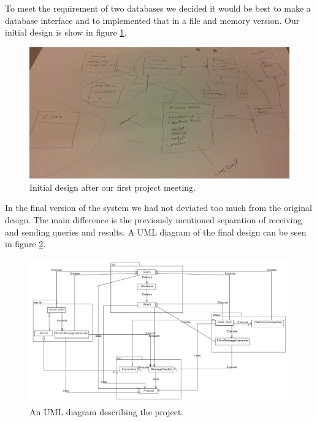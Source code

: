 \documentclass[10pt, a4paper]{article}
\begin{document}
To meet the requirement of two databases we decided it would be best to make a database interface and to implemented that in a file and memory version. Our initial design is show in figure \ref{init+design}.

\begin{figure}[hbt]
\begin{center}
\includegraphics[scale=0.38]{img/uml_blueprint.png}
\end{center}
\label{init+design}
\caption{Initial design after our first project meeting.}
\end{figure}

In the final version of the system we had not deviated too much from the original design. The main difference is the previously mentioned separation of receiving and sending queries and results. A UML diagram of the final design can be seen in figure \ref{UML}.

\begin{figure}[hbt]
\begin{center}
\includegraphics[scale=0.3]{img/uml.pdf}
\end{center}
\label{UML}
\caption{An UML diagram describing the project.}
\end{figure}
\end{document}
